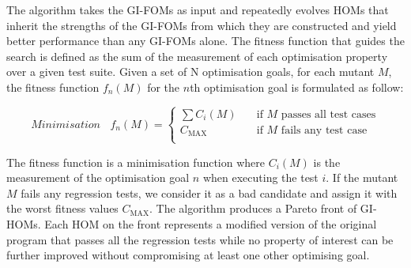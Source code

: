 \documentclass[oribibl]{llncs}
\begin{document}


The algorithm takes the GI-FOMs as input and repeatedly evolves HOMs that inherit the strengths of the GI-FOMs from which they are constructed and yield better performance than any GI-FOMs alone. The fitness function that guides the search is defined as the sum of the measurement of each optimisation property over a given test suite. Given a set of N optimisation goals, for each mutant $M$, the fitness function $f_n(M)$ for the $n$th optimisation goal is formulated as follow:

$$ \textit{Minimisation} ~~~~f_n(M)=
\begin{cases}
    \sum C_i(M)      & \quad \text{if } M \text{ passes all test cases}\\
    C_{\mathrm{MAX}}  & \quad \text{if } M \text{ fails any test case}\\
\end{cases}
$$


The fitness function is a minimisation function where $C_i(M)$ is the measurement of the optimisation goal $n$ when executing the test $i$. If the mutant $M$ fails any regression tests, we consider it as a bad candidate and assign it with the worst fitness values $C_{\mathrm{MAX}}$. The algorithm produces a Pareto front of GI-HOMs. Each HOM on the front represents a modified version of the original program that passes all the regression tests while no property of interest can be further improved without compromising at least one other optimising goal.

%
%
\end{document}
